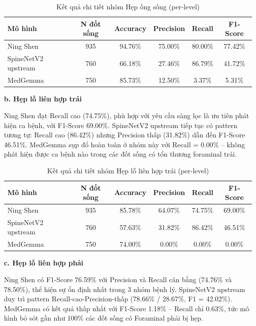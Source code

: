 \begin{table}[h!]
    \centering
    \caption{Kết quả chi tiết nhóm Hẹp ống sống (per-level)}
    \label{tab:scs_metrics}
    \renewcommand{\arraystretch}{1.2}
    \begin{tabular}{lccccc}
        \toprule
        \textbf{Mô hình} & \textbf{N đốt sống} & \textbf{Accuracy} & \textbf{Precision} & \textbf{Recall} & \textbf{F1-Score} \\
        \midrule
        Ning Shen & 935 & 94.76\% & 75.00\% & 80.00\% & 77.42\% \\
        SpineNetV2 upstream & 760 & 66.18\% & 27.46\% & 86.79\% & 41.72\% \\
        MedGemma & 750 & 85.73\% & 12.50\% & 3.37\% & 5.31\% \\
        \bottomrule
    \end{tabular}
\end{table}

\textbf{b. Hẹp lỗ liên hợp trái}

Ning Shen đạt Recall cao (74.75\%), phù hợp với yêu cầu sàng lọc là ưu tiên phát hiện ca bệnh, với F1-Score 69.00\%. SpineNetV2 upstream tiếp tục có pattern tương tự: Recall cao (86.42\%) nhưng Precision thấp (31.82\%) dẫn đến F1-Score 46.51\%. MedGemma sụp đổ hoàn toàn ở nhóm này với Recall = 0.00\% -- không phát hiện được ca bệnh nào trong các đốt sống có tổn thương foraminal trái.

\begin{table}[h!]
    \centering
    \caption{Kết quả chi tiết nhóm Hẹp lỗ liên hợp trái (per-level)}
    \label{tab:nfn_left_metrics}
    \renewcommand{\arraystretch}{1.2}
    \begin{tabular}{lccccc}
        \toprule
        \textbf{Mô hình} & \textbf{N đốt sống} & \textbf{Accuracy} & \textbf{Precision} & \textbf{Recall} & \textbf{F1-Score} \\
        \midrule
        Ning Shen & 935 & 85.78\% & 64.07\% & 74.75\% & 69.00\% \\
        SpineNetV2 upstream & 760 & 57.63\% & 31.82\% & 86.42\% & 46.51\% \\
        MedGemma & 750 & 74.00\% & 0.00\% & 0.00\% & 0.00\% \\
        \bottomrule
    \end{tabular}
\end{table}

\newpage

\textbf{c. Hẹp lỗ liên hợp phải}

Ning Shen có F1-Score 76.59\% với Precision và Recall cân bằng (74.76\% và 78.50\%), thể hiện sự ổn định nhất trong 3 nhóm bệnh lý. SpineNetV2 upstream duy trì pattern Recall-cao-Precision-thấp (78.66\% / 28.67\%, F1 = 42.02\%). MedGemma có kết quả thấp nhất với F1-Score 1.18\% -- Recall chỉ 0.63\%, tức mô hình bỏ sót gần như 100\% các đốt sống có Foraminal phải bị hẹp.

